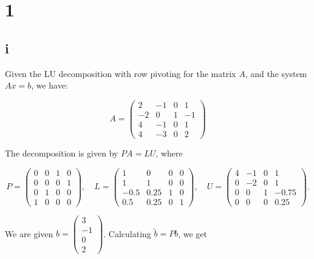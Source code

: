 \documentclass{article}
\begin{document}
\section*{1}
\subsection*{i}



Given the LU decomposition with row pivoting for the matrix \(A\), and the system \(Ax = b\), we have:

\[
    A = \begin{pmatrix}
        2  & -1 & 0 & 1  \\
        -2 & 0  & 1 & -1 \\
        4  & -1 & 0 & 1  \\
        4  & -3 & 0 & 2
    \end{pmatrix}
\]

The decomposition is given by \( PA = LU \), where

\[
    P = \begin{pmatrix}
        0 & 0 & 1 & 0 \\
        0 & 0 & 0 & 1 \\
        0 & 1 & 0 & 0 \\
        1 & 0 & 0 & 0
    \end{pmatrix}, \quad
    L = \begin{pmatrix}
        1    & 0    & 0 & 0 \\
        1    & 1    & 0 & 0 \\
        -0.5 & 0.25 & 1 & 0 \\
        0.5  & 0.25 & 0 & 1
    \end{pmatrix}, \quad
    U = \begin{pmatrix}
        4 & -1 & 0 & 1     \\
        0 & -2 & 0 & 1     \\
        0 & 0  & 1 & -0.75 \\
        0 & 0  & 0 & 0.25
    \end{pmatrix}.
\]

We are given \( b = \begin{pmatrix} 3 \\ -1 \\ 0 \\ 2 \end{pmatrix} \). Calculating \( \tilde{b} = Pb \), we get
\end{document}
